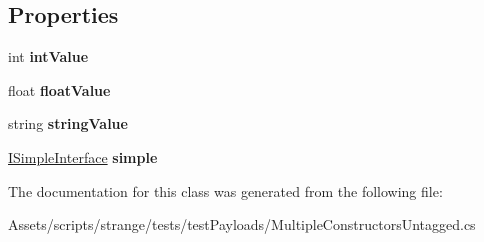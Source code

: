 \subsection*{Properties}
\begin{DoxyCompactItemize}
\item 
\hypertarget{classstrange_1_1unittests_1_1_multiple_constructors_untagged_a285e5e70dba5f06a824561d8481d804c}{int {\bfseries int\-Value}}\label{classstrange_1_1unittests_1_1_multiple_constructors_untagged_a285e5e70dba5f06a824561d8481d804c}

\item 
\hypertarget{classstrange_1_1unittests_1_1_multiple_constructors_untagged_a97c7253eb2fa9b5f9438c58fdecce27d}{float {\bfseries float\-Value}}\label{classstrange_1_1unittests_1_1_multiple_constructors_untagged_a97c7253eb2fa9b5f9438c58fdecce27d}

\item 
\hypertarget{classstrange_1_1unittests_1_1_multiple_constructors_untagged_a20cc2836c8c72c83b52658224a1ab540}{string {\bfseries string\-Value}}\label{classstrange_1_1unittests_1_1_multiple_constructors_untagged_a20cc2836c8c72c83b52658224a1ab540}

\item 
\hypertarget{classstrange_1_1unittests_1_1_multiple_constructors_untagged_a0c32eee2960e9b622e3a7508c4539b24}{\hyperlink{interfacestrange_1_1unittests_1_1_i_simple_interface}{I\-Simple\-Interface} {\bfseries simple}}\label{classstrange_1_1unittests_1_1_multiple_constructors_untagged_a0c32eee2960e9b622e3a7508c4539b24}

\end{DoxyCompactItemize}


The documentation for this class was generated from the following file\-:\begin{DoxyCompactItemize}
\item 
Assets/scripts/strange/tests/test\-Payloads/Multiple\-Constructors\-Untagged.\-cs\end{DoxyCompactItemize}
